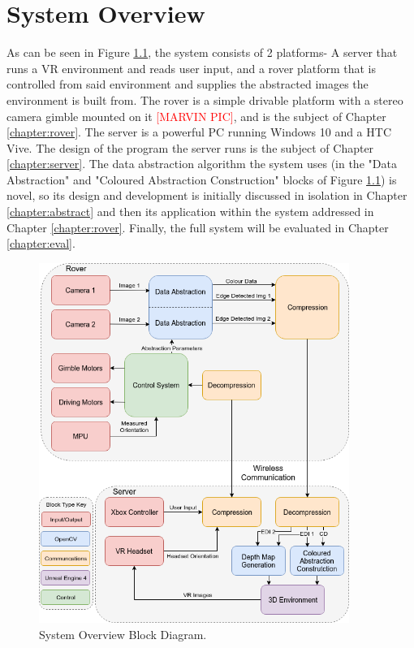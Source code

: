 \chapter{System Overview}

As can be seen in Figure \ref{fig:system}, the system consists of 2 platforms- A server that runs a VR environment and reads user input, and a rover platform that is controlled from said environment and supplies the abstracted images the environment is built from. The rover is a simple drivable platform with a stereo camera gimble mounted on it \textcolor{red}{[MARVIN PIC]}, and is the subject of Chapter \ref{chapter:rover}. The server is a powerful PC running Windows 10 and a HTC Vive. The design of the program the server runs is the subject of Chapter \ref{chapter:server}. The data abstraction algorithm the system uses (in the "Data Abstraction" and "Coloured Abstraction Construction" blocks of Figure \ref{fig:system}) is novel, so its design and development is initially discussed in isolation in Chapter \ref{chapter:abstract} and then its application within the system addressed in Chapter \ref{chapter:rover}. Finally, the full system will be evaluated in Chapter \ref{chapter:eval}.

\begin{figure}[H]
    \begin{center}
      \includegraphics[width=0.9\textwidth]{Figures/System.png}
      \caption[System Overview Block Diagram]{System Overview Block Diagram.}
      \label{fig:system}
    \end{center}
\end{figure}